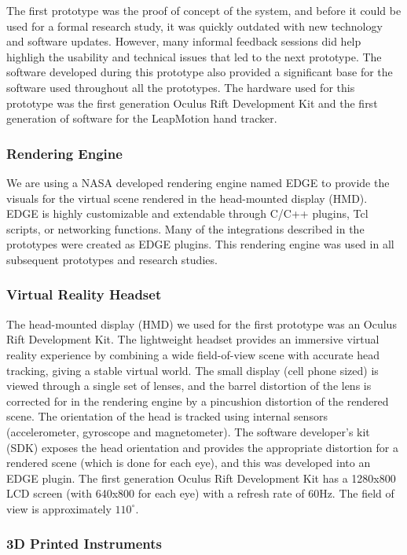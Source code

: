 The first prototype was the proof of concept of the system, and before it could be used for a formal research study, it was quickly outdated with new technology and software updates.
However, many informal feedback sessions did help highligh the usability and technical issues that led to the next prototype.
The software developed during this prototype also provided a significant base for the software used throughout all the prototypes.
The hardware used for this prototype was the first generation Oculus Rift Development Kit and the first generation of software for the LeapMotion hand tracker.

\subsubsection{Rendering Engine}

We are using a NASA developed rendering engine named EDGE to provide the visuals for the virtual scene rendered in the head-mounted display (HMD).
EDGE is highly customizable and extendable through C/C++ plugins, Tcl scripts, or networking functions.
Many of the integrations described in the prototypes were created as EDGE plugins.
This rendering engine was used in all subsequent prototypes and research studies.

\subsubsection{Virtual Reality Headset}

The head-mounted display (HMD) we used for the first prototype was an Oculus Rift Development Kit.
The lightweight headset provides an immersive virtual reality experience by combining a wide field-of-view scene with accurate head tracking, giving a stable virtual world.
The small display (cell phone sized) is viewed through a single set of lenses, and the barrel distortion of the lens is corrected for in the rendering engine by a pincushion distortion of the rendered scene.
The orientation of the head is tracked using internal sensors (accelerometer, gyroscope and magnetometer).
The software developer’s kit (SDK) exposes the head orientation and provides the appropriate distortion for a rendered scene (which is done for each eye), and this was developed into an EDGE plugin.
The first generation Oculus Rift Development Kit has a 1280x800 LCD screen (with 640x800 for each eye) with a refresh rate of 60Hz.
The field of view is approximately $110^{\circ}$.

\subsubsection{3D Printed Instruments}

